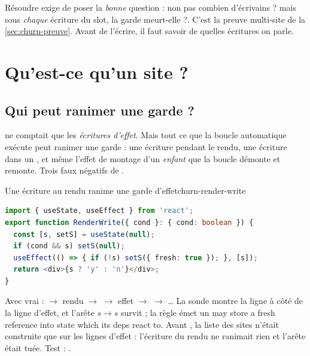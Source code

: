Résoudre  exige de poser la \emph{bonne} question : non pas \og combien
d'écrivains ?\fg{} mais \og sous \emph{chaque} écriture du slot, la garde meurt-elle ?\fg.
C'est la preuve multi-site de la \cref{sec:churn-preuve}. Avant de l'écrire, il faut
savoir de quelles écritures on parle.

\section{Qu'est-ce qu'un site ?}
\label{sec:churn-sites}

\subsection{Qui peut ranimer une garde ?}

 ne comptait que les \emph{écritures d'effet}. Mais tout ce que la boucle
automatique exécute peut ranimer une garde : une écriture pendant le rendu, une écriture
dans un , et même l'effet de montage d'un \emph{enfant} que la boucle démonte
et remonte. Trois faux négatifs de .

\begin{exemple}{Une écriture au rendu ranime une garde d'effet}{churn-render-write}
\begin{lstlisting}[language=TypeScript,caption={\file{/tmp/ch15/render_write.tsx}},label={lst:churn-render-write}]
import { useState, useEffect } from 'react';
export function RenderWrite({ cond }: { cond: boolean }) {
  const [s, setS] = useState(null);
  if (cond && s) setS(null);
  useEffect(() => { if (!s) setS({ fresh: true }); }, [s]);
  return <div>{s ? 'y' : 'n'}</div>;
}
\end{lstlisting}
Avec  vrai :  $\to$ rendu $\to$  $\to$ effet $\to$
 $\to$ … La sonde montre la ligne  à côté de la ligne d'effet, et l'arête
 $s \to s$  survit ; la règle émet un \Warning{}
\og may store a fresh reference into state  which its deps react to\fg. Avant
\snapshotCommit, la liste des sites n'était construite que sur les lignes d'effet : l'écriture
du rendu ne ranimait rien et l'arête était tuée. Test :
.
\end{exemple}

